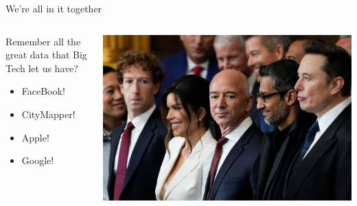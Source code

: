 \documentclass[
  ignorenonframetext,
]{beamer}
\providecommand{\tightlist}{%
  \setlength{\itemsep}{0pt}\setlength{\parskip}{0pt}}\usepackage{longtable,booktabs,array}
\begin{document}
\begin{frame}{We're all in it together}
\label{were-all-in-it-together}
\begin{columns}[T]
\begin{column}{0.4\textwidth}
Remember all the great data that Big Tech let us have?

\begin{itemize}
\tightlist
\item
  FaceBook!
\item
  CityMapper!
\item
  Apple!
\item
  Google!
\end{itemize}
\end{column}

\begin{column}{0.6\textwidth}
\includegraphics{images/tech_knobs.jpeg}
\end{column}
\end{columns}
\end{frame}
\end{document}
